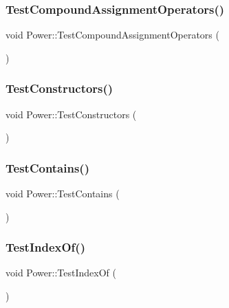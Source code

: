 \subsubsection{\texorpdfstring{Test\+Compound\+Assignment\+Operators()}{TestCompoundAssignmentOperators()}}
{\footnotesize\ttfamily void Power\+::\+Test\+Compound\+Assignment\+Operators (\begin{DoxyParamCaption}{ }\end{DoxyParamCaption})}

\mbox{\label{namespace_power_ac74fec7f3704b9c554276fa307de5bc5}} 
\subsubsection{\texorpdfstring{Test\+Constructors()}{TestConstructors()}}
{\footnotesize\ttfamily void Power\+::\+Test\+Constructors (\begin{DoxyParamCaption}{ }\end{DoxyParamCaption})}

\mbox{\label{namespace_power_a0746abde7fa9ae05b141ec163fb7f9fc}} 
\subsubsection{\texorpdfstring{Test\+Contains()}{TestContains()}}
{\footnotesize\ttfamily void Power\+::\+Test\+Contains (\begin{DoxyParamCaption}{ }\end{DoxyParamCaption})}

\mbox{\label{namespace_power_a6dc388a4544e6d59e43eab4625af166f}} 
\subsubsection{\texorpdfstring{Test\+Index\+Of()}{TestIndexOf()}}
{\footnotesize\ttfamily void Power\+::\+Test\+Index\+Of (\begin{DoxyParamCaption}{ }\end{DoxyParamCaption})}

